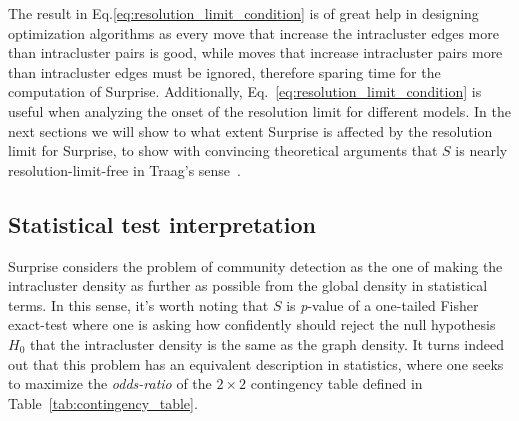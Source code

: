 
The result in Eq.\ref{eq:resolution_limit_condition} is of great help in designing optimization algorithms as every move that increase the intracluster edges more than intracluster pairs is good, while moves that increase intracluster pairs more than intracluster edges must be ignored, therefore sparing time for the computation of Surprise. Additionally, Eq.~\ref{eq:resolution_limit_condition} is useful when analyzing the onset of the resolution limit for different models.
In the next sections we will show to what extent Surprise is affected by the resolution limit for Surprise, to show with convincing theoretical arguments that $S$ is nearly resolution-limit-free in Traag's sense~\cite{traag2015}.

\subsection{Statistical test interpretation}\label{sec:surprisefishertest}
Surprise considers the problem of community detection as the one of making the intracluster density as further as possible from the global density in statistical terms. In this sense, it's worth noting that $S$ is \emph{p}-value of a one-tailed Fisher exact-test where one is asking how confidently should reject the null hypothesis $H_0$ that the intracluster density is the same as the graph density.
It turns indeed out that this problem has an equivalent description in statistics, where one seeks to maximize the \emph{odds-ratio} of the $2 \times 2$ contingency table defined in Table~\ref{tab:contingency_table}.

